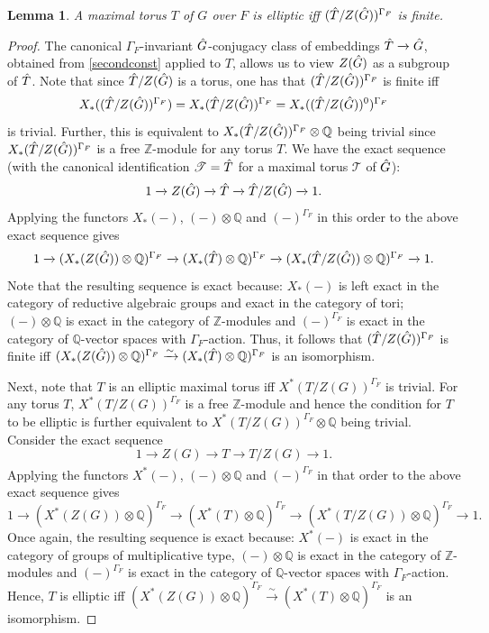 \documentclass[11pt,a4paper]{article}
\theoremstyle{definition}
\theoremstyle{plain}
\newtheorem{Le}[shared]{Lemma}
\theoremstyle{remark}
\theoremstyle{plain}
\begin{document}
\begin{Le}\label{ellipticmain}
    A maximal torus $T$ of $G$ over $F$ is elliptic iff $(\Hat{T}/Z(\Hat{G}))^{\Gamma_F}$ is finite.
\end{Le}
\begin{proof}
    The canonical $\Gamma_F$-invariant $\Hat{G}$-conjugacy class of embeddings $\Hat{T} \xrightarrow[]{} \Hat{G}$, obtained from \ref{secondconst} applied to $T$, allows us to view $Z(\Hat{G})$ as a subgroup of $\Hat{T}$. Note that since $\Hat{T}/Z(\Hat{G})$ is a torus, one has that $(\Hat{T}/Z(\Hat{G}))^{\Gamma_F}$ is finite iff $$X_*((\Hat{T}/Z(\Hat{G}))^{\Gamma_F}) = X_*(\Hat{T}/ Z(\Hat{G}))^{\Gamma_F} = X_*((\Hat{T}/ Z(\Hat{G}))^0)^{\Gamma_F}$$ is trivial. Further, this is equivalent to $X_*(\Hat{T}/Z(\Hat{G}))^{\Gamma_F} \otimes \mathbb{Q}$ being trivial since $X_*(\Hat{T}/Z(\Hat{G}))^{\Gamma_F}$ is a free $\mathbb{Z}$-module for any torus $T$. We have the exact sequence (with the canonical identification $\mathscr{T} = \Hat{T}$ for a maximal torus $\mathscr{T}$ of $\Hat{G}$):
    $$ 1 \xrightarrow[]{} Z(\Hat{G}) \xrightarrow[]{} \Hat{T} \xrightarrow[]{} \Hat{T}/Z(\Hat{G}) \xrightarrow[]{} 1.$$
    Applying the functors $X_*(-)$, $(-) \otimes \mathbb{Q}$ and $(-)^{\Gamma_F}$ in this order to the above exact sequence gives
    $$ 1 \xrightarrow[]{} (X_*(Z(\Hat{G}))\otimes \mathbb{Q})^{\Gamma_F} \xrightarrow[]{} (X_*(\Hat{T})\otimes \mathbb{Q})^{\Gamma_F} \xrightarrow[]{} (X_*(\Hat{T}/Z(\Hat{G}))\otimes \mathbb{Q})^{\Gamma_F} \xrightarrow[]{} 1. $$
    Note that the resulting sequence is exact because: $X_*(-)$ is left exact in the category of reductive algebraic groups and exact in the category of tori; $(-) \otimes \mathbb{Q}$ is exact in the category of $\mathbb{Z}$-modules and $(-)^{\Gamma_F}$ is exact in the category of $\mathbb{Q}$-vector spaces with $\Gamma_F$-action. Thus, it follows that $(\Hat{T}/Z(\Hat{G}))^{\Gamma_F}$ is finite iff $(X_*(Z(\Hat{G}))\otimes \mathbb{Q})^{\Gamma_F} \xrightarrow[]{\sim} (X_*(\Hat{T})\otimes \mathbb{Q})^{\Gamma_F}$ is an isomorphism.

    Next, note that $T$ is an elliptic maximal torus iff $X^*(T/Z(G))^{\Gamma_F}$ is trivial. For any torus $T$, $X^*(T/Z(G))^{\Gamma_F}$ is a free $\mathbb{Z}$-module and hence the condition for $T$ to be elliptic is further equivalent to $X^*(T/Z(G))^{\Gamma_F} \otimes \mathbb{Q}$ being trivial. Consider the exact sequence
    $$ 1 \xrightarrow[]{} Z(G) \xrightarrow[]{} T \xrightarrow[]{} T / Z(G) \xrightarrow[]{} 1.$$
    Applying the functors $X^*(-)$, $(-) \otimes \mathbb{Q}$ and $(-)^{\Gamma_F}$ in that order to the above exact sequence gives
    $$ 1 \xrightarrow[]{} (X^*(Z(G))\otimes \mathbb{Q})^{\Gamma_F} \xrightarrow[]{} (X^*(T) \otimes \mathbb{Q})^{\Gamma_F} \xrightarrow[]{} (X^*(T / Z(G)) \otimes \mathbb{Q})^{\Gamma_F} \xrightarrow[]{} 1.$$
    Once again, the resulting sequence is exact because: $X^*(-)$ is exact in the category of groups of multiplicative type, $(-) \otimes \mathbb{Q}$ is exact in the category of $\mathbb{Z}$-modules and $(-)^{\Gamma_F}$ is exact in the category of $\mathbb{Q}$-vector spaces with $\Gamma_F$-action. Hence, $T$ is elliptic iff $(X^*(Z(G))\otimes \mathbb{Q})^{\Gamma_F} \xrightarrow[]{\sim} (X^*(T) \otimes \mathbb{Q})^{\Gamma_F}$ is an isomorphism.


\end{proof}
\end{document}
